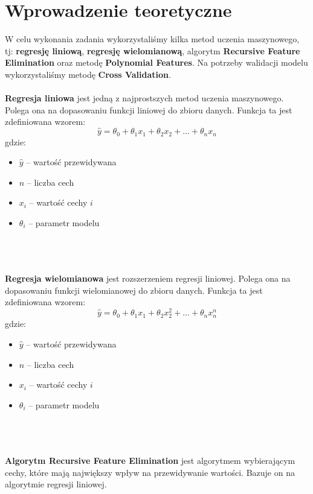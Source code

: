 \documentclass[11pt, a4paper, notitlepage]{report}
\begin{document}
\section{Wprowadzenie teoretyczne}
W celu wykonania zadania wykorzystaliśmy kilka metod uczenia maszynowego, tj: \textbf{regresję liniową}, \textbf{regresję wielomianową}, algorytm \textbf{Recursive Feature Elimination} oraz metodę \textbf{Polynomial Features}. Na potrzeby walidacji modelu wykorzystaliśmy metodę \textbf{Cross Validation}.
\\ \\
\textbf{Regresja liniowa} jest jedną z najprostszych metod uczenia maszynowego. Polega ona na dopasowaniu funkcji liniowej do zbioru danych. Funkcja ta jest zdefiniowana wzorem:
\begin{equation}
\hat{y} = \theta_0 + \theta_1x_1 + \theta_2x_2 + \ldots + \theta_nx_n
\end{equation}
gdzie:
\begin{itemize}
	\item $\hat{y}$ -- wartość przewidywana
	\item $n$ -- liczba cech
	\item $x_i$ -- wartość cechy $i$
	\item $\theta_i$ -- parametr modelu
\end{itemize}
\\ \\ \\
\textbf{Regresja wielomianowa} jest rozszerzeniem regresji liniowej. Polega ona na dopasowaniu funkcji wielomianowej do zbioru danych. Funkcja ta jest zdefiniowana wzorem:
\begin{equation}
\hat{y} = \theta_0 + \theta_1x_1 + \theta_2x_2^2 + \ldots + \theta_nx_n^n
\end{equation}
gdzie:
\begin{itemize}
	\item $\hat{y}$ -- wartość przewidywana
	\item $n$ -- liczba cech
	\item $x_i$ -- wartość cechy $i$
	\item $\theta_i$ -- parametr modelu
\end{itemize}
\\ \\ \\
\textbf{Algorytm Recursive Feature Elimination} jest algorytmem wybierającym cechy, które mają największy wpływ na przewidywanie wartości. Bazuje on na algorytmie regresji liniowej.
\\ \\
\end{document}

